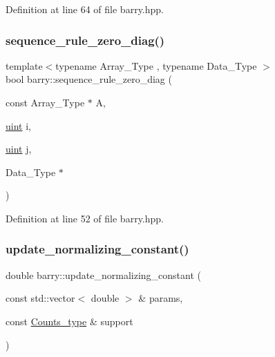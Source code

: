 Definition at line 64 of file barry.\+hpp.

\mbox{\label{namespacebarry_adec8d64df14ef90c3e94445e791eaa92}} 
\subsubsection{\texorpdfstring{sequence\+\_\+rule\+\_\+zero\+\_\+diag()}{sequence\_rule\_zero\_diag()}}
{\footnotesize\ttfamily template$<$typename Array\+\_\+\+Type , typename Data\+\_\+\+Type $>$ \\
bool barry\+::sequence\+\_\+rule\+\_\+zero\+\_\+diag (\begin{DoxyParamCaption}\item[{const Array\+\_\+\+Type $\ast$}]{A,  }\item[{\hyperlink{namespacebarry_a11dfc53ddb4672278319aa04f1e09a6c}{uint}}]{i,  }\item[{\hyperlink{namespacebarry_a11dfc53ddb4672278319aa04f1e09a6c}{uint}}]{j,  }\item[{Data\+\_\+\+Type $\ast$}]{ }\end{DoxyParamCaption})\hspace{0.3cm}{\ttfamily [inline]}}



Definition at line 52 of file barry.\+hpp.

\mbox{\label{namespacebarry_a822db820c95822d0e7a51728d9b9858d}} 
\subsubsection{\texorpdfstring{update\+\_\+normalizing\+\_\+constant()}{update\_normalizing\_constant()}}
{\footnotesize\ttfamily double barry\+::update\+\_\+normalizing\+\_\+constant (\begin{DoxyParamCaption}\item[{const std\+::vector$<$ double $>$ \&}]{params,  }\item[{const \hyperlink{namespacebarry_a3e2d8c3b6cf602107559d4237d9f1315}{Counts\+\_\+type} \&}]{support }\end{DoxyParamCaption})\hspace{0.3cm}{\ttfamily [inline]}}



